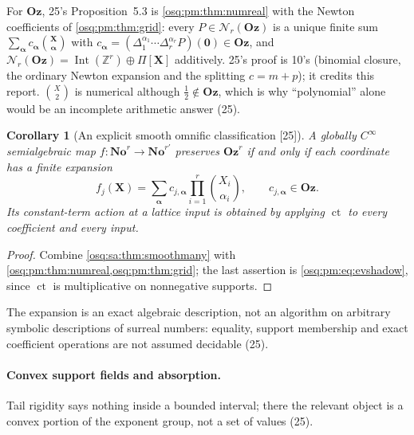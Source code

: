 \documentclass[11pt,letterpaper]{article}
\numberwithin{equation}{section}
\newtheorem{corollary}[corollary]{Corollary}
\theoremstyle{definition}
\theoremstyle{remark}
\theoremstyle{plain}
\newcommand{\No}{\mathbf{No}}
\newcommand{\Oz}{\mathbf{Oz}}
\newcommand{\Z}{\mathbb Z}
\newcommand{\ct}{\operatorname{ct}}
\newcommand{\Int}{\operatorname{Int}}
\newcommand{\Num}{\mathscr N}
\newcommand{\src}[1]{\textup{\textsf{[#1]}}}
\begin{document}
For $\Oz$, 25's Proposition~5.3 is \cref{osq:pm:thm:numreal} with the Newton coefficients of \cref{osq:pm:thm:grid}: every $P\in\Num_r(\Oz)$ is a unique
finite sum $\sum_{\boldsymbol\alpha}c_{\boldsymbol\alpha}\binom{\mathbf X}{\boldsymbol\alpha}$ with $c_{\boldsymbol\alpha}=(\Delta_1^{\alpha_1}\cdots
\Delta_r^{\alpha_r}P)(\mathbf 0)\in\Oz$, and $\Num_r(\Oz)=\Int(\Z^r)\oplus\Pi[\mathbf X]$ additively. 25's proof is 10's (binomial closure, the ordinary
Newton expansion and the splitting $c=m+p$); it credits this report. $\binom X2$ is numerical although $\frac12\notin\Oz$, which is why ``polynomial''
alone would be an incomplete arithmetic answer (25).

\begin{corollary}[An explicit smooth omnific classification \src{25}]\label{osq:sa:cor:explicit}
A globally $C^\infty$ semialgebraic map $f:\No^r\to\No^{r'}$ preserves $\Oz^r$ if and only if each coordinate has a finite expansion
\begin{equation}\label{osq:sa:eq:newton}
 f_j(\mathbf X)=\sum_{\boldsymbol\alpha}c_{j,\boldsymbol\alpha}\prod_{i=1}^r\binom{X_i}{\alpha_i},\qquad c_{j,\boldsymbol\alpha}\in\Oz .
\end{equation}
Its constant-term action at a lattice input is obtained by applying $\ct$ to every coefficient and every input.
\end{corollary}
\begin{proof}
Combine \cref{osq:sa:thm:smoothmany} with \cref{osq:pm:thm:numreal,osq:pm:thm:grid}; the last assertion is \eqref{osq:pm:eq:evshadow}, since $\ct$ is
multiplicative on nonnegative supports.
\end{proof}

The expansion is an exact algebraic description, not an algorithm on arbitrary symbolic descriptions of surreal numbers: equality, support membership and
exact coefficient operations are not assumed decidable (25).

\paragraph{Convex support fields and absorption.} Tail rigidity says nothing inside a bounded interval; there the relevant object is a convex portion of
the exponent group, not a set of values (25).
\end{document}
